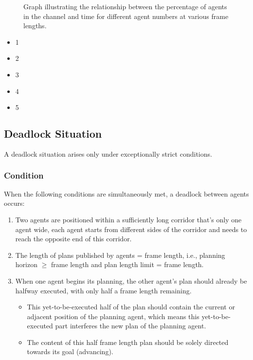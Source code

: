 {\begin{figure}[htb]
    \caption{Graph illustrating the relationship between the percentage of agents in the channel and time for different agent numbers at various frame lengths.}
    \label{fig:grid}
\end{figure}




\begin{itemize}
    \item 1
    \item 2
    \item 3
    \item 4
    \item 5
\end{itemize}

}

\subsection{Deadlock Situation}

A deadlock situation arises only under exceptionally strict conditions.

\subsubsection{Condition}
When the following conditions are simultaneously met, a deadlock between agents occurs:

\begin{enumerate}
    \item Two agents are positioned within a sufficiently long corridor that's only one agent wide, each agent starts from different sides of the corridor and needs to reach the opposite end of this corridor.
    \item The length of plans published by agents = frame length, i.e., planning horizon $\geq$ frame length and plan length limit = frame length.
    \item When one agent begins its planning, the other agent's plan should already be halfway executed, 
    with only half a frame length remaining. 
    \begin{itemize}
        \item This yet-to-be-executed half of the plan should contain the current or adjacent position of the planning agent, which means this yet-to-be-executed part interferes the new plan of the planning agent. 
        \item The content of this half frame length plan should be solely directed towards its goal (advancing).
    \end{itemize}
\end{enumerate}

